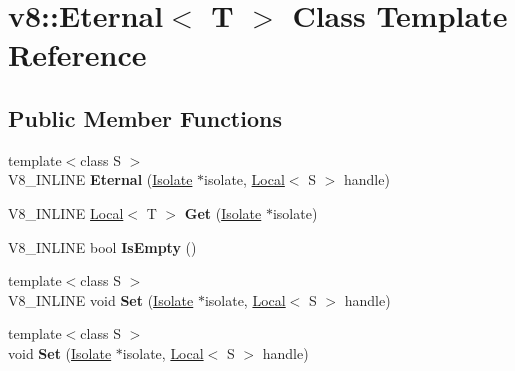 \hypertarget{classv8_1_1_eternal}{}\section{v8\+:\+:Eternal$<$ T $>$ Class Template Reference}
\label{classv8_1_1_eternal}
\subsection*{Public Member Functions}
\begin{DoxyCompactItemize}
\item 
{\footnotesize template$<$class S $>$ }\\V8\+\_\+\+I\+N\+L\+I\+NE {\bfseries Eternal} (\hyperlink{classv8_1_1_isolate}{Isolate} $\ast$isolate, \hyperlink{classv8_1_1_local}{Local}$<$ S $>$ handle)\hypertarget{classv8_1_1_eternal_ad7522d8b51e072dcbc4261bc1f155bcb}{}\label{classv8_1_1_eternal_ad7522d8b51e072dcbc4261bc1f155bcb}

\item 
V8\+\_\+\+I\+N\+L\+I\+NE \hyperlink{classv8_1_1_local}{Local}$<$ T $>$ {\bfseries Get} (\hyperlink{classv8_1_1_isolate}{Isolate} $\ast$isolate)\hypertarget{classv8_1_1_eternal_ae9614309d9c93fe484d81926e31ed6b7}{}\label{classv8_1_1_eternal_ae9614309d9c93fe484d81926e31ed6b7}

\item 
V8\+\_\+\+I\+N\+L\+I\+NE bool {\bfseries Is\+Empty} ()\hypertarget{classv8_1_1_eternal_a5d77cbfe0662af5fe75172be9a8f1d5d}{}\label{classv8_1_1_eternal_a5d77cbfe0662af5fe75172be9a8f1d5d}

\item 
{\footnotesize template$<$class S $>$ }\\V8\+\_\+\+I\+N\+L\+I\+NE void {\bfseries Set} (\hyperlink{classv8_1_1_isolate}{Isolate} $\ast$isolate, \hyperlink{classv8_1_1_local}{Local}$<$ S $>$ handle)\hypertarget{classv8_1_1_eternal_a75a32f5c428a0d47e13f66dbdeb9adba}{}\label{classv8_1_1_eternal_a75a32f5c428a0d47e13f66dbdeb9adba}

\item 
{\footnotesize template$<$class S $>$ }\\void {\bfseries Set} (\hyperlink{classv8_1_1_isolate}{Isolate} $\ast$isolate, \hyperlink{classv8_1_1_local}{Local}$<$ S $>$ handle)\hypertarget{classv8_1_1_eternal_a2f9dcec02b2c2f7d4b55aee0d8b9881a}{}\label{classv8_1_1_eternal_a2f9dcec02b2c2f7d4b55aee0d8b9881a}

\end{DoxyCompactItemize}
